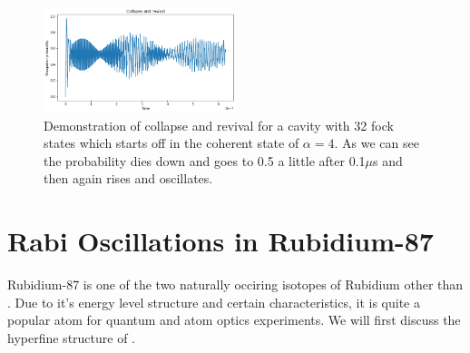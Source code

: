 \documentclass[%
 reprint,
 amsmath,amssymb,
 aps,
]{revtex4-2}
\begin{document}
\begin{figure}[ht]
    \centering
    \includegraphics[width=0.5\textwidth]{images/collapse and revival 3}
    \caption{Demonstration of collapse and revival for a cavity with 32 fock states which starts off in the coherent state of $\alpha=4$. As we can see the probability dies down and goes to 0.5 a little after 0.1$\mu$s and then again rises and oscillates.}
\end{figure}

\section{Rabi Oscillations in Rubidium-87}
Rubidium-87 is one of the two naturally occiring isotopes of Rubidium other than . Due to it's energy level structure and certain characteristics, it is quite a popular atom for quantum and atom optics experiments. We will first discuss the hyperfine structure of .
\end{document}

